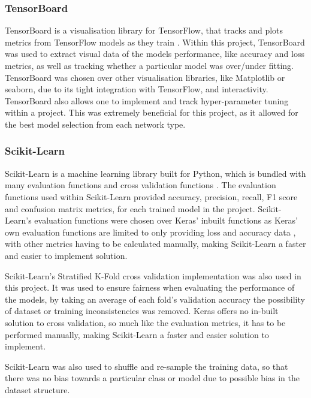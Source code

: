 \subsubsection{TensorBoard}
TensorBoard is a visualisation library for TensorFlow, that tracks and plots metrics from TensorFlow models as they train \citep{TensorBo28:online}. Within this project, TensorBoard was used to extract visual data of the models performance, like accuracy and loss metrics, as well as tracking whether a particular model was over/under fitting. TensorBoard was chosen over other visualisation libraries, like Matplotlib or seaborn, due to its tight integration with TensorFlow, and interactivity. TensorBoard also allows one to implement and track hyper-parameter tuning within a project. This was extremely beneficial for this project, as it allowed for the best model selection from each network type.

\subsubsection{Scikit-Learn}
Scikit-Learn is a machine learning library built for Python, which is bundled with many evaluation functions \citep{33Metric9:online} and cross validation functions \citep{31Crossv34:online}. The evaluation functions used within Scikit-Learn provided accuracy, precision, recall, F1 score and confusion matrix metrics, for each trained model in the project. Scikit-Learn's evaluation functions were chosen over Keras' inbuilt functions as Keras' own evaluation functions are limited to only providing loss and accuracy data \citep{Modeltra48:online}, with other metrics having to be calculated manually, making Scikit-Learn a faster and easier to implement solution. 

Scikit-Learn's Stratified K-Fold \citep{sklearnm1:online} cross validation implementation was also used in this project. It was used to ensure fairness when evaluating the performance of the models, by taking an average of each fold's validation accuracy the possibility of dataset or training inconsistencies was removed. Keras offers no in-built solution to cross validation, so much like the evaluation metrics, it has to be performed manually, making Scikit-Learn a faster and easier solution to implement.

Scikit-Learn was also used to shuffle and re-sample the training data, so that there was no bias towards a particular class or model due to possible bias in the dataset structure.

